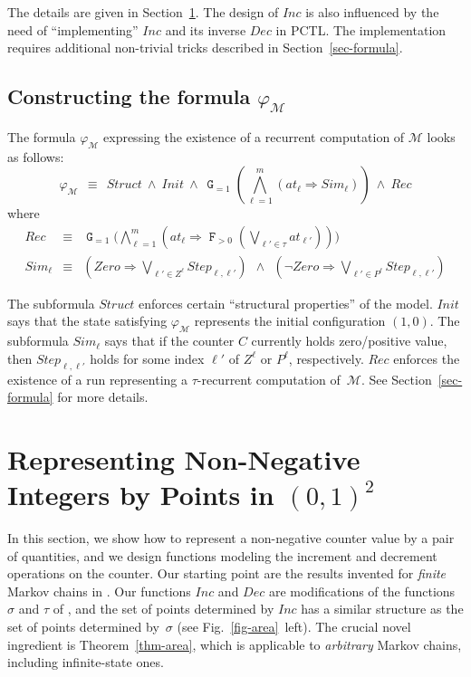 \documentclass[a4paper,UKenglish,cleveref, autoref, thm-restate]{lipics-v2021}
\newcommand{\M}{\mathcal{M}}
\newcommand{\Init}{\mathit{Init}}
\newcommand{\Simulate}{\mathit{Sim}}
\newcommand{\Step}{\mathit{Step}}
\newcommand{\Zero}{\mathit{Zero}}
\newcommand{\at}{\mathit{at}}
\newcommand{\INC}{\mathit{Inc}}
\newcommand{\DEC}{\mathit{Dec}}
\newcommand{\Struct}{\textit{Struct}}
\newcommand{\Rec}{\textit{Rec}}
\newcommand*{\opf}{\operatorname{\pmb{\mathtt{F}}}}
\newcommand*{\opg}{\operatorname{\pmb{\mathtt{G}}}}
\begin{document}
The details are given in Section~\ref{sec-geom}. The design of $\INC$ is also influenced by the need of ``implementing'' $\INC$ and its inverse $\DEC$ in PCTL. The implementation requires additional non-trivial tricks described in Section~\ref{sec-formula}. 

\subsection{Constructing the formula $\varphi_\M$}

The formula $\varphi_{\M}$ expressing the existence of a recurrent computation of $\M$ looks as follows:
\begin{equation*}\textstyle
    \varphi_{\M} ~~\equiv~~ \Struct ~\wedge~ \Init ~\wedge~ 
       \opg_{=1} (\bigwedge_{\ell =1}^m (\at_\ell \Rightarrow \Simulate_\ell)) 
       ~\wedge~ \Rec
\end{equation*}
where
\begin{eqnarray*}
    \Rec & \equiv & \textstyle\opg_{=1}\big(\bigwedge_{\ell=1}^m (\at_\ell \Rightarrow \opf_{>0} (\bigvee_{\ell' \in \tau}\at_{\ell'}))\big)\\
    \Simulate_\ell & \equiv & \textstyle(\Zero \Rightarrow \bigvee_{\ell' \in Z^\ell} \Step_{\ell,\ell'}) ~~\wedge~~
    (\neg\Zero \Rightarrow \bigvee_{\ell' \in P^\ell} \Step_{\ell,\ell'})
\end{eqnarray*}

The subformula $\Struct$ enforces certain ``structural properties'' of the model. $\Init$ says that the state satisfying $\varphi_{\M}$ represents the initial configuration $(1,0)$. The subformula $\Simulate_\ell$
says that if the counter $C$ currently holds zero/positive value, then $\Step_{\ell,\ell'}$ holds for some index $\ell'$ of $Z^{\ell}$ or $P^{\ell}$, respectively. $\Rec$ enforces the existence of a run representing a $\tau$-recurrent computation of~$\M$. See Section~\ref{sec-formula} for more details.
 
\section{Representing Non-Negative Integers by Points in $(0,1)^2$}
\label{sec-geom}

In this section, we show how to represent a non-negative counter value by a pair of quantities, and we design functions modeling the increment and decrement operations on the counter. Our starting point are the results invented for \emph{finite} Markov chains in \cite{ChK:PCTL-finite-sat-LICS}. Our functions $\INC$ and $\DEC$ are modifications of the functions $\sigma$ and $\tau$ of \cite{ChK:PCTL-finite-sat-LICS}, and the set of points determined by $\INC$ 
has a similar structure as the set of points determined by~$\sigma$ (see Fig.~\ref{fig-area}~left). The crucial novel ingredient is Theorem~\ref{thm-area}, which is applicable to \emph{arbitrary} Markov chains, including infinite-state ones. 
\end{document}
